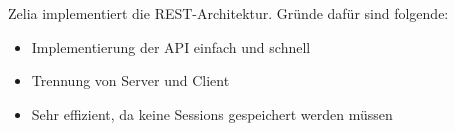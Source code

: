 
Zelia implementiert die REST-Architektur. Gründe dafür sind folgende: 

\begin{itemize}
    \item Implementierung der API einfach und schnell
    \item Trennung von Server und Client 
    \item Sehr effizient, da keine Sessions gespeichert werden müssen 
\end{itemize}
\cite{WikiREST}
